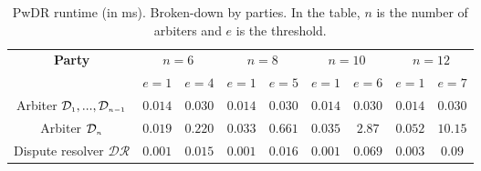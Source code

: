 

 \begin{table*}[!htbp]

\caption{ \small PwDR runtime (in ms). Broken-down by parties. In the table, $n$ is the number of arbiters and $e$ is the threshold.} \label{table::PwDR-runtime} 
\begin{center}

\begin{tabular}{|c|c|c|c|c|c|c|c|c|} 

   \hline
   

\multirow{2}{*}{\scriptsize \textbf{Party}}& \multicolumn{2}{c|}{\scriptsize $n=6$}& \multicolumn{2}{c|}{\scriptsize $n=8$}&\multicolumn{2}{c|}{\scriptsize $n=10$}&\multicolumn{2}{c|}{\scriptsize $n=12$}\\
 \cline{2-9} 
&\scriptsize$e=1$&\scriptsize$e=4$&\scriptsize$e=1$ &\scriptsize$e=5$&\scriptsize$e=1$&\scriptsize$e=6$&\scriptsize$e=1$&\scriptsize$e=7$\\

\hline

   \scriptsize   {Arbiter $\mathcal{D}_{\scriptscriptstyle 1},..., \mathcal{D}_{\scriptscriptstyle n-1}$ }&\cellcolor{gray!20}\scriptsize$0.014$&\cellcolor{gray!20}\scriptsize$0.030$& \cellcolor{gray!20}\scriptsize$0.014$& \cellcolor{gray!20}\scriptsize$ 0.030$&\cellcolor{gray!20}\scriptsize$0.014$&\cellcolor{gray!20}\scriptsize$0.030$&\cellcolor{gray!20}\scriptsize$0.014$&\cellcolor{gray!20}\scriptsize$0.030$\\
         
            \cline{1-5} 


   \scriptsize   {Arbiter $\mathcal{D}_{\scriptscriptstyle n}$ }&\cellcolor{gray!20}\scriptsize$0.019$&\cellcolor{gray!20}\scriptsize$0.220$&\cellcolor{gray!20} \cellcolor{gray!20}\scriptsize$0.033$& \cellcolor{gray!20}\scriptsize$0.661$&\cellcolor{gray!20}\scriptsize$0.035$&\cellcolor{gray!20}\scriptsize$2.87$&\cellcolor{gray!20}\scriptsize$0.052$&\cellcolor{gray!20}\scriptsize$10.15$\\      
           
            \cline{1-5} 

 \scriptsize Dispute resolver $\mathcal{DR}$&\cellcolor{gray!20}\scriptsize$0.001$&\cellcolor{gray!20}\scriptsize$0.015$& \cellcolor{gray!20}\scriptsize $0.001$& \cellcolor{gray!20}\scriptsize$0.016$&\cellcolor{gray!20}\scriptsize$0.001$&\cellcolor{gray!20}\scriptsize$0.069$&\cellcolor{gray!20}\scriptsize$0.003$&\cellcolor{gray!20}\scriptsize$0.09$\\
 
 \hline
 
\end{tabular}  %
\end{center}

\end{table*}




